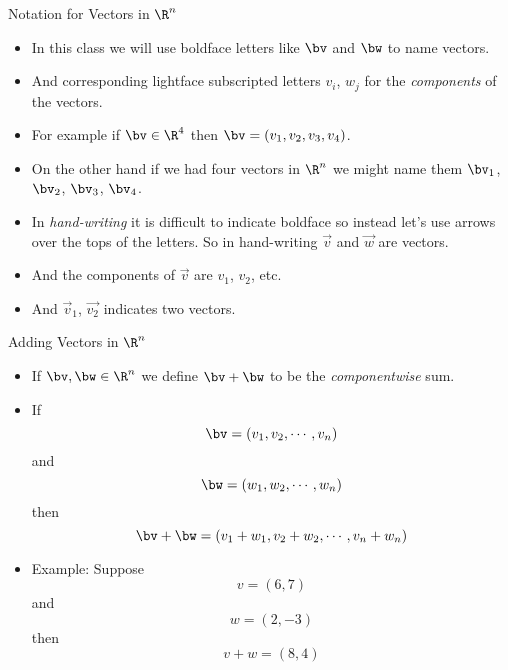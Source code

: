 \documentclass{beamer}
\begin{document}
\begin{frame}{Notation for Vectors in $\R^n$}

\begin{itemize}
\item In this class we will use boldface letters like $\bv$ and $\bw$ to name
vectors.
\item And corresponding lightface subscripted letters $v_i$, $w_j$ for the
\emph{components} of the vectors.
\item For example if $\bv\in\R^4$ then $\bv=(v_1, v_2, v_3, v_4)$.
\item On the other hand if we had four vectors in $\R^n$ we might name them
$\bv_1$, $\bv_2$, $\bv_3$, $\bv_4$.
\item In \emph{hand-writing} it is difficult to indicate boldface so instead
let's use arrows over the tops of the letters. So in hand-writing
$\vec{v}$ and $\vec{w}$ are vectors.
\item And the components of $\vec{v}$ are $v_1$, $v_2$, etc.
\item And $\vec{v}_1$, $\vec{v_2}$ indicates two vectors.
\end{itemize}

\end{frame}

\begin{frame}{Adding Vectors in $\R^n$}

\begin{itemize}
\item If $\bv, \bw \in \R^n$ we define $\bv+\bw$ to be the \emph{componentwise} sum.
\item If $$\bv=(v_1, v_2, \cdots , v_n)$$ and $$\bw=(w_1, w_2, \cdots, w_n)$$
then $$\bv+\bw = (v_1 + w_1, v_2 + w_2, \cdots, v_n + w_n)$$
\item Example: Suppose $$v = (6, 7)$$ and $$w=(2, -3)$$ then
$$v+w=(8, 4)$$
\end{itemize}

\end{frame}

\beamerdefaultoverlayspecification{}
\end{document}
